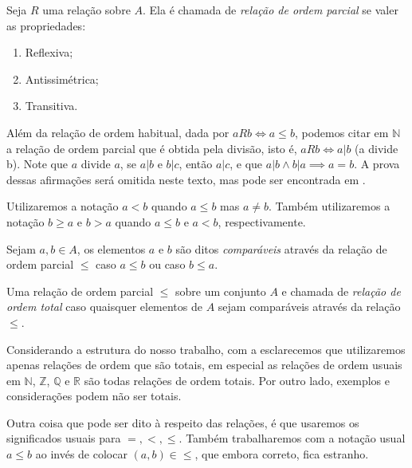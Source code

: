 \documentclass[../main.tex]{subfiles}
\begin{document}
\begin{defi}\label{agb-def-relOrd}
    Seja $R$ uma relação sobre $A$. Ela é chamada de \emph{relação de ordem parcial} se valer as propriedades:
    \begin{enumerate}[label=(\roman*)]
        \item Reflexiva;
        \item Antissimétrica;
        \item Transitiva.
    \end{enumerate}
\end{defi}

Além da relação de ordem habitual, dada por $aRb \iff a \leq b$, podemos citar em $\mathbb{N}$ a relação de ordem parcial que é obtida pela divisão, isto é, $a R b \iff a | b$ (a divide b). Note que $a$ divide $a$, se $a | b$ e $b | c$, então $a | c$, e que $a | b \land b | a \implies a=b$. A prova dessas afirmações será omitida neste texto, mas pode ser encontrada em \textcite[p. 52]{domingues-2009}.

\begin{defi} 
    Utilizaremos a notação $a < b$ quando $a \leq b$ mas $a \neq b$. Também utilizaremos a notação $b \geq a$ e $b > a$ quando $a \leq b$ e $a < b$, respectivamente.
\end{defi}

\begin{defi}
    Sejam $a,b \in A$, os elementos $a$ e $b$ são ditos \emph{comparáveis} através da relação de ordem parcial $\leq$ caso $a \leq b$ ou caso $b \leq a$. 
\end{defi}

\begin{defi}\label{agb-defOrdTotal}
    Uma relação de ordem parcial $\leq$ sobre um conjunto $A$ e chamada de \emph{relação de ordem total} caso quaisquer elementos de $A$ sejam comparáveis através da relação $\leq$.
\end{defi}

Considerando a estrutura do nosso trabalho, com a  esclarecemos que utilizaremos apenas relações de ordem que são totais, em especial as relações de ordem usuais em $\mathbb{N}$, $\mathbb{Z}$, $\mathbb{Q}$ e $\mathbb{R}$ são todas relações de ordem totais. Por outro lado, exemplos e considerações podem não ser totais. 

Outra coisa que pode ser dito à respeito das relações, é que usaremos os significados usuais para $=, <, \leq$. Também trabalharemos com a notação usual $a \leq b$ ao invés de colocar $(a,b) \in \leq$, que embora correto, fica estranho. 
\end{document}
